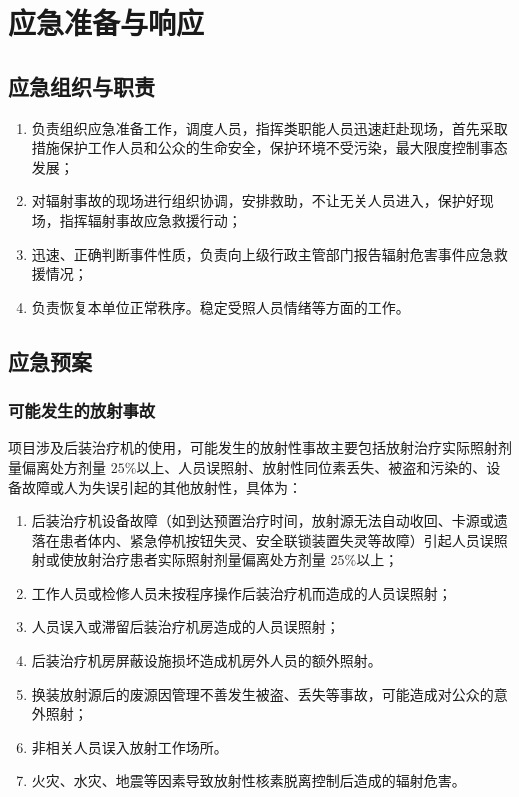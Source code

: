 \chapter{应急准备与响应}

\section{应急组织与职责}


\begin{enumerate}
\item 负责组织应急准备工作，调度人员，指挥类职能人员迅速赶赴现场，首先采取措施保护工作人员和公众的生命安全，保护环境不受污染，最大限度控制事态发展；
\item 对辐射事故的现场进行组织协调，安排救助，不让无关人员进入，保护好现场，指挥辐射事故应急救援行动；
\item 迅速、正确判断事件性质，负责向上级行政主管部门报告辐射危害事件应急救援情况；
\item 负责恢复本单位正常秩序。稳定受照人员情绪等方面的工作。
\end{enumerate}

\section{应急预案}

\subsection{可能发生的放射事故}

项目涉及后装治疗机的使用，可能发生的放射性事故主要包括放射治疗实际照射剂量偏离处方剂量 $2 5 \%$以上、人员误照射、放射性同位素丢失、被盗和污染的、设备故障或人为失误引起的其他放射性，具体为：

\begin{enumerate}
\item 后装治疗机设备故障（如到达预置治疗时间，放射源无法自动收回、卡源或遗落在患者体内、紧急停机按钮失灵、安全联锁装置失灵等故障）引起人员误照射或使放射治疗患者实际照射剂量偏离处方剂量 $2 5 \%$以上；
\item 工作人员或检修人员未按程序操作后装治疗机而造成的人员误照射；
\item 人员误入或滞留后装治疗机房造成的人员误照射；
\item 后装治疗机房屏蔽设施损坏造成机房外人员的额外照射。
\item 换装放射源后的废源因管理不善发生被盗、丢失等事故，可能造成对公众的意外照射；
\item 非相关人员误入放射工作场所。
\item 火灾、水灾、地震等因素导致放射性核素脱离控制后造成的辐射危害。
\end{enumerate}

